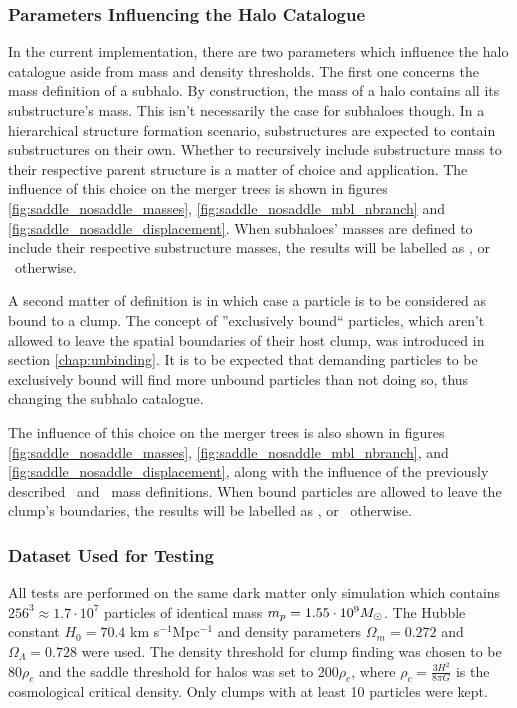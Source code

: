 \subsubsection{Parameters Influencing the Halo Catalogue}

In the current implementation, there are two parameters which influence the halo catalogue aside from mass and density thresholds.
The first one concerns the mass definition of a subhalo.
By construction, the mass of a halo contains all its substructure's mass.
This isn't necessarily the case for subhaloes though.
In a hierarchical structure formation scenario, substructures are expected to contain substructures on their own.
Whether to recursively include substructure mass to their respective parent structure is a matter of choice and application. 
The influence of this choice on the merger trees is shown in figures \ref{fig:saddle_nosaddle_masses}, \ref{fig:saddle_nosaddle_mbl_nbranch} and \ref{fig:saddle_nosaddle_displacement}.
When subhaloes' masses are defined to include their respective substructure masses, the results will be labelled as \inc, or \exc\ otherwise.




A second matter of definition is in which case a particle is to be considered as bound to a clump.
The concept of ''exclusively bound`` particles, which aren't allowed to leave the spatial boundaries of their host clump, was introduced in section \ref{chap:unbinding}.
It is to be expected that demanding particles to be exclusively bound will find more unbound particles than not doing so, thus changing the subhalo catalogue.

The influence of this choice on the merger trees is also shown in figures \ref{fig:saddle_nosaddle_masses}, \ref{fig:saddle_nosaddle_mbl_nbranch}, and \ref{fig:saddle_nosaddle_displacement}, along with the influence of the previously described \inc\ and \exc\ mass definitions.
When bound particles are allowed to leave the clump's boundaries, the results will be labelled as \nosad, or \sad\ otherwise.







\subsubsection{Dataset Used for Testing}
All tests are performed on the same dark matter only simulation which contains $256^3 \approx 1.7\cdot 10^7$ particles of identical mass $m_p = 1.55\cdot 10^9M_\odot$. 
The Hubble constant $H_0 = 70.4$ km s$^{-1}$Mpc$^{-1}$ and density parameters $\Omega_m = 0.272$ and $\Omega_\Lambda = 0.728$ were used. 
The density threshold for clump finding was chosen to be 80$\rho_c$  and the saddle threshold for halos was set to 200$\rho_c$, where $\rho_c = \frac{3 H^2}{8 \pi G}$ is the cosmological critical density. 
Only clumps with at least 10 particles were kept.

